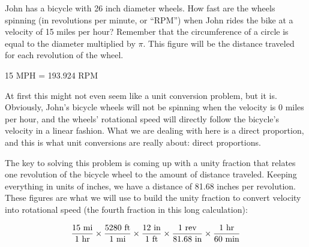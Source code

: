

John has a bicycle with 26 inch diameter wheels.  How fast are the wheels spinning (in revolutions per minute, or ``RPM'') when John rides the bike at a velocity of 15 miles per hour?  Remember that the circumference of a circle is equal to the diameter multiplied by $\pi$.  This figure will be the distance traveled for each revolution of the wheel.







15 MPH = 193.924 RPM

\vskip 10pt

At first this might not even seem like a unit conversion problem, but it is.  Obviously, John's bicycle wheels will not be spinning when the velocity is 0 miles per hour, and the wheels' rotational speed will directly follow the bicycle's velocity in a linear fashion.  What we are dealing with here is a direct proportion, and this is what unit conversions are really about: direct proportions.

The key to solving this problem is coming up with a unity fraction that relates one revolution of the bicycle wheel to the amount of distance traveled.  Keeping everything in units of inches, we have a distance of 81.68 inches per revolution.  These figures are what we will use to build the unity fraction to convert velocity into rotational speed (the fourth fraction in this long calculation):

$${15 \hbox{ mi} \over 1 \hbox{ hr}} \times {5280 \hbox{ ft} \over 1 \hbox{ mi}} \times {12 \hbox{ in} \over 1 \hbox{ ft}} \times {1 \hbox{ rev} \over 81.68 \hbox{ in}} \times {1 \hbox{ hr} \over 60 \hbox{ min}}$$











